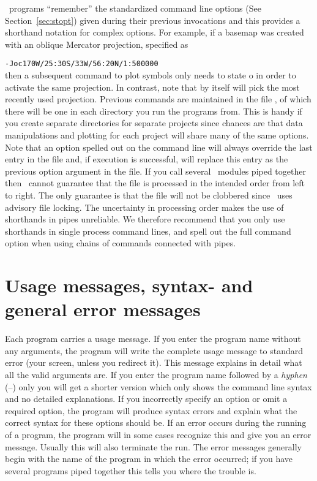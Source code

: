 \GMT\ programs ``remember'' the standardized command line options
(See Section~\ref{sec:stopt}) given during their previous invocations
and this provides a shorthand notation for complex options.
For example, if a basemap was created with an oblique Mercator
projection, specified as

\vspace{\baselineskip}

\texttt{-Joc170W/25:30S/33W/56:20N/1:500000} \\

\vspace{\baselineskip}
\noindent
then a subsequent  command to plot symbols only needs
to state o in order to activate the same projection.  In
contrast, note that  by itself will pick the most recently used projection.
Previous commands are maintained in the file ,
of which there will be one in each directory you run the programs
from.  This is handy if you create separate directories for
separate projects since chances are that data manipulations
and plotting for each project will share many of the same options.
Note that an option spelled out on the command line will always
override the last entry in the  file and,
if execution is successful, will replace this entry as the
previous option argument in the  file.
If you call several \GMT\ modules piped together then \GMT\ cannot
guarantee that the  file is processed
in the intended order from left to right.  The only guarantee
is that the file will not be clobbered since \GMT\ uses advisory
file locking.  The uncertainty in processing order makes the use
of shorthands in pipes unreliable.  We therefore recommend that you
only use shorthands in single process command lines, and spell out
the full command option when using chains of commands connected with
pipes.

\section{Usage messages, syntax- and general error messages}

Each program carries a usage message.  If you enter the program
name without any arguments, the program will write the complete
usage message to standard error (your screen, unless you
redirect it).  This message explains in detail what all the
valid arguments are.  If you enter the program name followed
by a \emph{hyphen} (--) only you will get a shorter version
which only shows the command line syntax and no detailed
explanations.  If you incorrectly specify an option or omit
a required option, the program will produce syntax errors and
explain what the correct syntax for these options should be.
If an error occurs during the running of a program, the
program will in some cases recognize this and give you an
error message.  Usually this will also terminate the run.
The error messages generally begin with the name of the
program in which the error occurred; if you have several
programs piped together this tells you where the trouble is.

